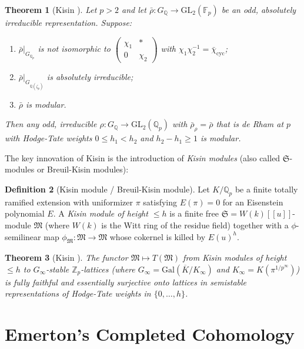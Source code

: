 \documentclass[12pt,a4paper]{amsart}
\newtheorem{theorem}{Theorem}[section]
\theoremstyle{definition}
\newtheorem{definition}[theorem]{Definition}
\theoremstyle{remark}
\newcommand{\Gal}{\mathrm{Gal}}
\newcommand{\GL}{\mathrm{GL}}
\newcommand{\Qp}{\mathbb{Q}_p}
\newcommand{\Zp}{\mathbb{Z}_p}
\newcommand{\GQ}{G_{\mathbb{Q}}}
\newcommand{\Q}{\mathbb{Q}}
\newcommand{\F}{\mathbb{F}}
\begin{document}
\begin{theorem}[Kisin \cite{Kisin2009}]\label{thm:kisin}
  Let $p > 2$ and let $\bar{\rho}\colon \GQ \to \GL_2(\F_p)$ be an odd, absolutely
  irreducible representation. Suppose:
  \begin{enumerate}[label=(\roman*)]
    \item $\bar{\rho}|_{G_{\Qp}}$ is not isomorphic to
      $\begin{pmatrix} \chi_1 & * \\ 0 & \chi_2 \end{pmatrix}$
      with $\chi_1\chi_2^{-1} = \bar{\chi}_{\mathrm{cyc}}$;
    \item $\bar{\rho}|_{G_{\Q(\zeta_p)}}$ is absolutely irreducible;
    \item $\bar{\rho}$ is modular.
  \end{enumerate}
  Then any odd, irreducible $\rho\colon \GQ \to \GL_2(\Qp)$ with $\bar{\rho}_\rho = \bar{\rho}$
  that is de Rham at $p$ with Hodge-Tate weights $0 \leq h_1 < h_2$ and $h_2 - h_1 \geq 1$
  is modular.
\end{theorem}

The key innovation of Kisin is the introduction of \emph{Kisin modules} (also called
$\mathfrak{S}$-modules or Breuil-Kisin modules):

\begin{definition}[Kisin module / Breuil-Kisin module]
  Let $K/\Qp$ be a finite totally ramified extension with uniformizer $\pi$ satisfying
  $E(\pi) = 0$ for an Eisenstein polynomial $E$. A \emph{Kisin module of height $\leq h$}
  is a finite free $\mathfrak{S} = W(k)[[u]]$-module $\mathfrak{M}$ (where $W(k)$ is the
  Witt ring of the residue field) together with a $\phi$-semilinear map
  $\phi_\mathfrak{M}\colon \mathfrak{M} \to \mathfrak{M}$ whose cokernel is killed by $E(u)^h$.
\end{definition}

\begin{theorem}[Kisin \cite{Kisin2006}]
  The functor $\mathfrak{M} \mapsto T(\mathfrak{M})$ from Kisin modules of height $\leq h$
  to $G_\infty$-stable $\Zp$-lattices (where $G_\infty = \Gal(\overline{K}/K_\infty)$ and
  $K_\infty = K(\pi^{1/p^\infty})$) is fully faithful and essentially surjective onto
  lattices in semistable representations of Hodge-Tate weights in $\{0,\ldots,h\}$.
\end{theorem}

\section{Emerton's Completed Cohomology}\label{sec:emerton}
\end{document}

